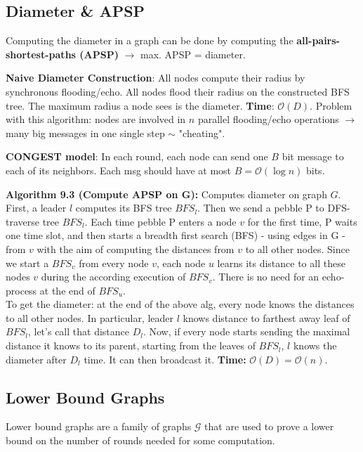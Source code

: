 \documentclass[a4paper, 8pt, landscape]{scrartcl}
\begin{document}
\begin{multicols*}{3}
\subsection{Diameter \& APSP}

Computing the diameter in a graph can be done by computing the \textbf{all-pairs-shortest-paths (APSP)} $\rightarrow$ max. APSP = diameter.

\textbf{Naive Diameter Construction}: All nodes compute their radius by synchronous flooding/echo. All nodes flood their radius on the constructed BFS tree. The maximum radius a node sees is the diameter. \textbf{Time}: $\mathcal{O}(D)$. Problem with this algorithm: nodes are involved in $n$ parallel flooding/echo operations $\rightarrow$ many big messages in one single step $\sim$ "cheating".

\textbf{CONGEST model}: In each round, each node can send one $B$ bit message to each of its neighbors. Each msg should have at most $B = \mathcal{O}(\log n)$ bits.

\textbf{Algorithm 9.3 (Compute APSP on G):} Computes diameter on graph $G$. First, a leader $l$ computes its BFS tree $BFS_l$. Then we send a pebble P to DFS-traverse tree $BFS_l$. Each time pebble P enters a node $v$ for the first time, P waits one time slot, and then starts a breadth first search (BFS) - using edges in G - from $v$ with the aim of computing the distances from $v$ to all other nodes. Since we start a $BFS_v$ from every node $v$, each node $u$ learns its distance to all these nodes $v$ during the according execution of $BFS_v$. There is no need for an echo-process at the end of $BFS_u$.\\
To get the diameter: at the end of the above alg, every node knows the distances to all other nodes. In particular, leader $l$ knows distance to farthest away leaf of $BFS_l$, let’s call that distance $D_l$. Now, if every node starts sending the maximal distance it
knows to its parent, starting from the leaves of $BFS_l$, $l$ knows the diameter after $D_l$ time. It can then broadcast it. \textbf{Time:} $\mathcal{O}(D) = \mathcal{O}(n)$.

\subsection{Lower Bound Graphs}

Lower bound graphs are a family of graphs $\mathcal{G}$ that are used to prove a lower bound on the number of rounds needed for some computation.


\end{multicols*}
\end{document}
